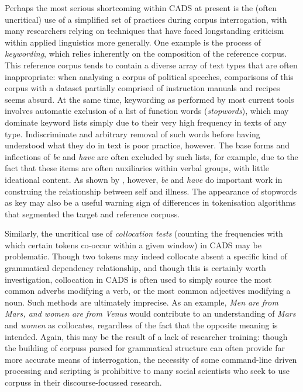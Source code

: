 Perhaps the most serious shortcoming within \gls{CADS} at present is the (often uncritical) use of a simplified set of practices during \gls{corpus} interrogation, with many researchers relying on techniques that have faced longstanding criticism within applied linguistics more generally. One example is the process of \emph{keywording}, which relies inherently on the composition of the reference \gls{corpus}. This reference \gls{corpus} tends to contain a diverse array of text types that are often inappropriate: when analysing a \gls{corpus} of political speeches, comparisons of this \gls{corpus} with a dataset partially comprised of instruction manuals and recipes seems absurd. At the same time, keywording as performed by most current tools involves automatic exclusion of a list of function words (\emph{stopwords}), which may dominate keyword lists simply due to their very high frequency in texts of any type. Indiscriminate and arbitrary removal of such words before having understood what they do in text is poor practice, however. The base forms and inflections of \emph{be} and \emph{have} are often excluded by such lists, for example, due to the fact that these items are often auxiliaries within verbal groups, with little ideational content. As shown by \textcite{harvey_disclosures_2012}, however, \emph{be} and \emph{have} do important work in construing the relationship between self and illness. The appearance of stopwords as key may also be a useful warning sign of differences in tokenisation algorithms that segmented the target and reference \glspl{corpus}.

Similarly, the uncritical use of \emph{collocation tests} (counting the frequencies with which certain tokens co\hyp{}occur within a given window) in \gls{CADS} may be problematic. Though two tokens may indeed collocate absent a specific kind of grammatical dependency relationship, and though this is certainly worth investigation, collocation in \gls{CADS} is often used to simply source the most common adverbs modifying a verb, or the most common adjectives modifying a noun. Such methods are ultimately imprecise. As an example, \emph{Men are from Mars, and women are from Venus} would contribute to an understanding of \emph{Mars} and \emph{women} as collocates, regardless of the fact that the opposite meaning is intended. Again, this may be the result of a lack of researcher training: though the building of \glspl{corpus} parsed for grammatical structure can often provide far more accurate means of interrogation, the necessity of some command\hyp{}line driven processing and scripting is prohibitive to many social scientists who seek to use \glspl{corpus} in their discourse\hyp{}focussed research. 

